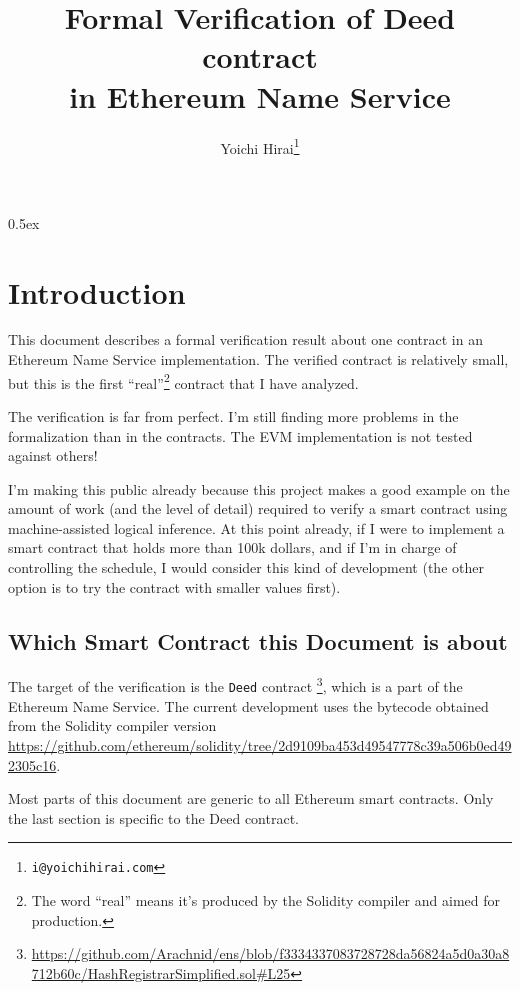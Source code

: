 \documentclass[11pt,a4paper]{article}
\begin{document}
\title{Formal Verification of Deed contract\\in Ethereum Name Service}
\author{Yoichi Hirai\footnote{\texttt{i@yoichihirai.com}}}
\maketitle

\tableofcontents

\parindent 0pt\parskip 0.5ex

\section{Introduction}

This document describes a formal verification result about one contract in
an Ethereum Name Service implementation.  The verified contract is relatively small,
but this is the first ``real''\footnote{The word ``real'' means it's
produced by the Solidity compiler and aimed for production.}
contract that I have analyzed.

The verification is far from perfect.
I'm still finding more problems in the
formalization than in the contracts.  The EVM implementation is not tested against
others!

I'm making this public already because this project makes a
good example on the amount of work (and the level of detail) required to
verify a smart contract using machine-assisted logical inference.  At this
point already, if I were to
implement a smart contract that holds more than 100k dollars, and if
I'm in charge of controlling the schedule, I would consider this kind of
development (the other option is to try the contract with smaller values first).

\subsection{Which Smart Contract this Document is about}

The target of the verification is the \texttt{Deed} contract%
\footnote{\url{https://github.com/Arachnid/ens/blob/f3334337083728728da56824a5d0a30a8712b60c/HashRegistrarSimplified.sol\#L25}},
which is a part of the Ethereum Name Service.
The current development uses the bytecode obtained from the
Solidity compiler version \url{https://github.com/ethereum/solidity/tree/2d9109ba453d49547778c39a506b0ed492305c16}.

Most parts of this document are generic to all Ethereum smart
contracts.  Only the last section is specific to the Deed contract.
\end{document}

